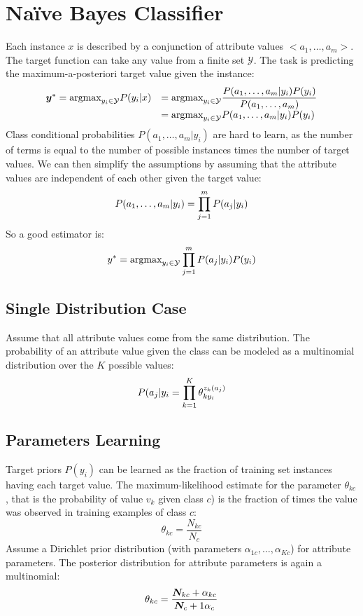 \section{Naïve Bayes Classifier}
Each instance $x$ is described by a conjunction of attribute values $<a_1,\hdots, a_m>$. The target function can take any value from a finite set $\mathcal{Y}$. \newline
The task is predicting the maximum-a-posteriori target value given the instance:
\[
  \begin{array}{ll}
    \bm{y}^*=\text{argmax}_{y_i\in\mathcal{Y}}P(y_i\vert x)&=\text{argmax}_{y_i\in\mathcal{Y}}\dfrac{P(a_1,\hdots,a_m\vert y_i)P(y_i)}{P(a_1,\hdots,a_m)}\\
                                                      &=\text{argmax}_{y_i\in\mathcal{Y}}P(a_1,\hdots,a_m\vert y_i)P(y_i)
  \end{array}
\]
Class conditional probabilities $P(a_1,\hdots,a_m\vert y_i)$ are hard to learn, as the number of terms is equal to the number of possible instances times the number of target values. We can then simplify the assumptions by assuming that the attribute values are independent of each other given the target value:
\[P(a_1,\hdots, a_m\vert y_i)=\displaystyle\prod_{j=1}^mP(a_j\vert y_i)\]
So a good estimator is:
\begin{equation}
  y^*=\text{argmax}_{y_i\in\mathcal{Y}}\displaystyle\prod_{j=1}^mP(a_j\vert y_i)P(y_i)
\end{equation}
%
%
\subsection{Single Distribution Case}
Assume that all attribute values come from the same distribution. The probability of an attribute value given the class can be modeled as a multinomial distribution over the $K$ possible values:
\[P(a_j\vert y_i=\displaystyle\prod_{k=1}^K\theta_{ky_i}^{z_k(a_j)}\]
%
%
\subsection{Parameters Learning}
Target priors $P(y_i)$ can be learned as the fraction of training set instances having each target value. \newline
The maximum-likelihood estimate for the parameter $\theta_{kc}$, that is the probability of value $v_k$ given class $c$) is the fraction of times the value was observed in training examples of class $c$:
\[\theta_{kc}=\frac{N_{kc}}{N_c}\]
Assume a Dirichlet prior distribution (with parameters $\alpha_{1c},\hdots,\alpha_{Kc}$) for attribute parameters. The posterior distribution for attribute parameters is again a multinomial:
\[\theta_{kc}=\frac{\bm{N}_{kc}+\alpha_{kc}}{\bm{N}_c+1\alpha_c}\]
%
%
